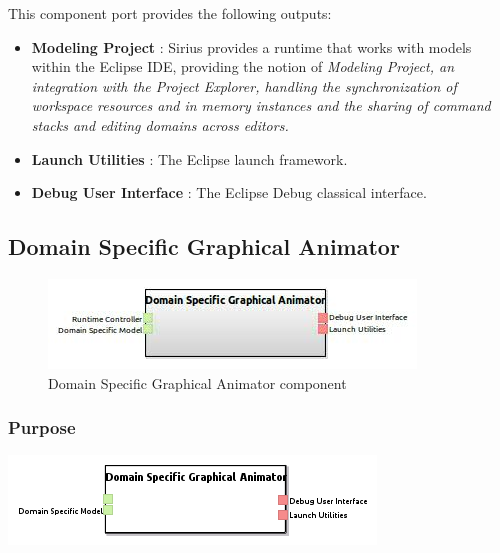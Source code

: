 \documentclass{gemoc} %
\begin{document}
This component port provides the following outputs:
\begin{itemize}
  \item \textbf{Modeling Project} :
Sirius provides a runtime that works with models within the Eclipse IDE, providing the notion of \em{Modeling Project}, an integration with the Project Explorer, handling the synchronization of workspace resources and in memory instances and the sharing of command stacks and editing domains across editors.
  \item \textbf{Launch Utilities} :
The Eclipse launch framework.
  \item \textbf{Debug User Interface} :
The Eclipse Debug classical interface.
\end{itemize}

\subsection{Domain Specific Graphical Animator}

\begin{figure}[htp]
	\begin{center}
	\includegraphics*[trim=0.0cm 0.0cm 0cm 0.0cm, clip=true, scale=1.0]{../images/generated/Generated_Domain Specific Graphical Animator.jpg}
	\caption{Domain Specific Graphical Animator component}
	\end{center}
\end{figure}

\subsubsection{Purpose}

\begin{center}
\includegraphics*[trim=0.0cm 0.0cm 0cm 0.0cm, clip=true]{../images/generated/Generated_Domain_Specific_Graphical_Animator.png}
\end{center}
\end{document}
